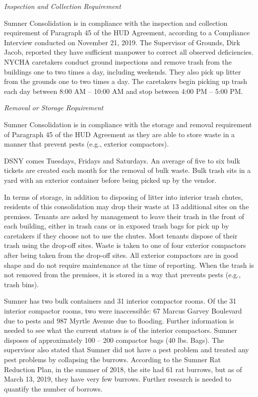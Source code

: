 


\emph{Inspection and Collection Requirement}

Sumner Consolidation is in compliance with the inspection and collection requirement of  Paragraph 45 of the HUD Agreement, according to a Compliance Interview conducted on November 21, 2019. The Supervisor of Grounds, Dirk Jacob, reported they have sufficient manpower to correct all observed deficiencies. NYCHA caretakers conduct ground inspections and remove trash from the buildings one to two times a day, including weekends. They also pick up litter from the grounds one to two times a day. The caretakers begin picking up trash each day between 8:00 AM -- 10:00 AM and stop between 4:00 PM -- 5:00 PM. 



\emph{Removal or Storage Requirement}

Sumner Consolidation is in compliance with the storage and removal requirement of Paragraph 45 of the HUD Agreement as they are able to store waste in a manner that prevent pests (e.g., exterior compactors).

 

DSNY comes Tuesdays, Fridays and Saturdays. An average of five to six bulk tickets are created each month for the removal of bulk waste. Bulk trash sits in a yard with an exterior container before being picked up by the vendor.



In terms of storage, in addition to disposing of litter into interior trash chutes, residents of this consolidation may drop their waste at 13 additional sites on the premises. Tenants are asked by management to leave their trash in the front of each building, either in trash cans or in exposed trash bags for pick up by caretakers if they choose not to use the chutes. Most tenants dispose of their trash using the drop-off sites. Waste is taken to one of four exterior compactors after being taken from the drop-off sites. All exterior compactors are in good shape and do not require maintenance at the time of reporting. When the trash is not removed from the premises, it is stored in a way that prevents pests (e.g., trash bins).



Sumner has two bulk containers and 31 interior compactor rooms. Of the 31 interior compactor rooms, two were inaccessible: 67 Marcus Garvey Boulevard due to pests and 987 Myrtle Avenue due to flooding. Further information is needed to see what the current statues is of the interior compactors. Sumner disposes of approximately 100 -- 200 compactor bags (40 lbs. Bags). The supervisor also stated that Sumner did not have a pest problem and treated any pest problems by collapsing the burrows. According to the Sumner Rat Reduction Plan, in the summer of 2018, the site had 61 rat burrows, but as of March 13, 2019, they have very few burrows. Further research is needed to quantify the number of borrows.




